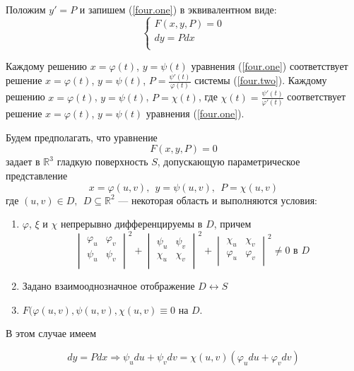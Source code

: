 \documentclass{article}
\newcommand{\re}[1]{(\ref{#1})}
\begin{document}
  Положим $y' = P$ и запишем \re{four.one} в эквивалентном виде:
  \begin{equation}
  \begin{cases}
  \label{four.two}
  F(x ,y, P) = 0 \\
  dy = Pdx \\
  \end{cases}
  \end{equation}

  Каждому решению $x = \varphi(t)$, $y = \psi(t)$ уравнения \re{four.one} соответствует решение $x = \varphi(t)$, $y = \psi(t)$, $P = \frac{\psi'(t)}{\varphi(t)}$ системы \re{four.two}. Каждому решению $x = \varphi(t)$, $y = \psi(t)$, $P = \chi(t)$, где $\chi(t) = \frac{\psi'(t)}{\varphi'(t)}$ соответствует решение $x = \varphi(t)$, $y = \psi(t)$ уравнения \re{four.one}.

  Будем предполагать, что уравнение
  \[ F(x, y, P) = 0 \]
  задает в $\mathbb{R}^3$ гладкую поверхность $S$, допускающую параметрическое представление
  \[ x = \varphi(u, v),~~ y = \psi(u, v),~~ P = \chi(u, v) \]
  где $(u, v) \in D,~~ D \subseteq \mathbb{R}^2$ --- некоторая область и выполняются условия:
  \begin{enumerate}
  \item $\varphi$, $\xi$ и $\chi$ непрерывно дифференцируемы в $D$, причем
  \[ 
  \begin{vmatrix}
  \varphi_u & \varphi_v \\
  \psi_u & \psi_v \\
  \end{vmatrix}^2
  +
  \begin{vmatrix}
  \psi_u & \psi_v \\
  \chi_u & \chi_v \\
  \end{vmatrix}^2
  + 
  \begin{vmatrix}
  \chi_u & \chi_v \\
  \varphi_u & \varphi_v \\
  \end{vmatrix}^2
  \neq 0 \text{ в $D$}\]
  \item Задано взаимооднозначное отображение $D \leftrightarrow S$
  \item $F(\varphi(u, v), \psi(u ,v), \chi(u, v) \equiv 0$ на $D$.
  \end{enumerate}

  В этом случае имеем

  \[ dy = Pdx \Rightarrow \psi_udu + \psi_vdv = \chi(u ,v)(\varphi_udu + \varphi_vdv) \]
\end{document}

